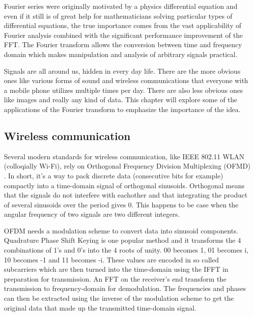 Fourier series were originally motivated by a physics differential equation and even if it still is of great help for mathematicians solving particular types of differential equations, the true importance comes from the vast applicability of Fourier analysis combined with the significant performance improvement of the FFT. The Fourier transform allows the conversion between time and frequency domain which makes manipulation and analysis of arbitrary signals practical. 

Signals are all around us, hidden in every day life. There are the more obvious ones like various forms of sound and wireless communications that everyone with a mobile phone utilizes multiple times per day. There are also less obvious ones like images and really any kind of data. This chapter will explore some of the applications of the Fourier transform to emphasize the importance of the idea. 

\subsection{Wireless communication}
Several modern standards for wireless communication, like IEEE 802.11 WLAN (colloqially Wi-Fi), rely on Orthogonal Frequency Division Multiplexing (OFMD) . In short, it's a way to pack discrete data (consecutive bits for example) compactly into a time-domain signal of orthogonal sinusoids. Orthogonal means that the signals do not interfere with eachother and that integrating the product of several sinusoids over the period gives 0. This happens to be case when the angular frequency of two signals are two different integers. 

OFDM needs a modulation scheme to convert data into sinusoid components. Quadrature Phase Shift Keying is one popular method and it transforms the 4 combinations of 1's and 0's into the 4 roots of unity. 00 becomes 1, 01 becomes i, 10 becomes -1 and 11 becomes -i. These values are encoded in so called subcarriers which are then turned into the time-domain using the IFFT in preparation for transmission. An FFT on the receiver's end transform the transmission to frequency-domain for demodulation. The frequencies and phases can then be extracted using the inverse of the modulation scheme to get the original data that made up the transmitted time-domain signal.


